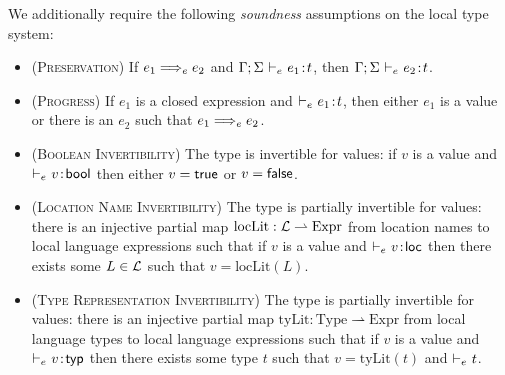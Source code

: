 \label{sec:sound-type-systems}
We additionally require the following \emph{soundness} assumptions on the local type system:
\begin{itemize}
	\item (\textsc{Preservation}) If $e_1 \localstep e_2$ and $\Gamma;\Sigma ~{\vdash}_{\footnotesize{e}}~ e_1 \mkern2mu{:}\mkern2mu t$, then $\Gamma;\Sigma ~{\vdash}_{\footnotesize{e}}~ e_2 \mkern2mu{:}\mkern2mu t$.

	\item (\textsc{Progress}) If $e_1$ is a closed expression and ${\vdash}_{\footnotesize{e}}~ e_1 \mkern2mu{:}\mkern2mu t$, then either $e_1$ is a value or there is an $e_2$ such that $e_1 \localstep e_2$.

	\item (\textsc{Boolean Invertibility}) The type \Bool is invertible for values: if $v$ is a value and ${\vdash}_{\footnotesize{e}}~ v \mkern2mu{:}\mkern2mu \mathsf{bool}$ then either $v = \mathsf{true}$ or $v = \mathsf{false}$.

	\item (\textsc{Location Name Invertibility}) The type \Loc is partially invertible for values: there is an injective partial map $\text{locLit} : \mathcal{L} \rightharpoonup \text{Expr}$ from location names to local language expressions such that if $v$ is a value and ${\vdash}_{\footnotesize{e}}~ v \mkern2mu{:}\mkern2mu \mathsf{loc}$ then there exists some $L \in \mathcal{L}$ such that $v = \text{locLit}(L)$.

	\item (\textsc{Type Representation Invertibility}) The type \Typ is partially invertible for values: there is an injective partial map $\text{tyLit} : \text{Type} \rightharpoonup \text{Expr}$ from local language types to local language expressions such that if $v$ is a value and ${\vdash}_{\footnotesize{e}}~ v \mkern2mu{:}\mkern2mu \mathsf{typ}$ then there exists some type $t$ such that $v = \text{tyLit}(t)$ and ${\vdash}_{\footnotesize{e}}~ t$.
\end{itemize}

